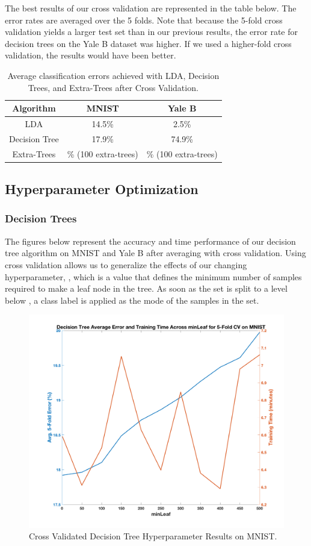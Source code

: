 The best results of our cross validation are represented in the table below. The error rates are averaged over the 5 folds. Note that because the 5-fold cross validation yields a larger test set than in our previous results, the error rate for decision trees on the Yale B dataset was higher. If we used a higher-fold cross validation, the results would have been better.
%
\begin{table}[H]
  \centering
  \begin{tabular}{||c | c | c||} 
    \hline
    Algorithm & MNIST & Yale B \\
    \hline\hline
    LDA & 14.5\%  & 2.5\% \\ 
    \hline
    Decision Tree & 17.9\% & 74.9\% \\ 
    \hline
    Extra-Trees & \% (100 extra-trees) & \% (100 extra-trees) \\
    \hline
  \end{tabular}
  \caption{Average classification errors achieved with LDA, Decision Trees, and Extra-Trees after Cross Validation.}
\end{table}


\subsection{Hyperparameter Optimization}

\subsubsection{Decision Trees}

The figures below represent the accuracy and time performance of our decision tree algorithm on MNIST and Yale B after averaging with cross validation. Using cross validation allows us to generalize the effects of our changing hyperparameter, , which is a value that defines the minimum number of samples required to make a leaf node in the tree. As soon as the set is split to a level below , a class label is applied as the mode of the samples in the set.
%
\begin{figure}[H]
  \centering\includegraphics[width=0.6\columnwidth]{../images/cv_dt_mnist}
  \caption{Cross Validated Decision Tree Hyperparameter Results on MNIST.}
\end{figure}

